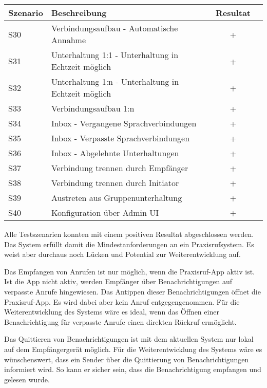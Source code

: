 \begin{table}[h]
    \centering
    \begin{tabular}{|l|p{11cm}|c|c|}
        \hline
        \textbf{Szenario} & \textbf{Beschreibung} & \textbf{Resultat} \\
        \hline
        S30         & Verbindungsaufbau - Automatische Annahme & +\\
        \hline
        S31         & Unterhaltung 1:1 - Unterhaltung in Echtzeit möglich & +\\
        \hline
        S32         & Unterhaltung 1:n - Unterhaltung in Echtzeit möglich & +\\
        \hline
        S33         & Verbindungsaufbau 1:n & +\\
        \hline
        S34         & Inbox - Vergangene Sprachverbindungen & +\\
        \hline
        S35         & Inbox - Verpasste Sprachverbindungen & +\\
        \hline
        S36         & Inbox - Abgelehnte Unterhaltungen & +\\
        \hline
        S37         & Verbindung trennen durch Empfänger & +\\
        \hline
        S38         & Verbindung trennen durch Initiator & +\\
        \hline
        S39         & Austreten aus Gruppenunterhaltung & +\\
        \hline
        S40         & Konfiguration über Admin UI & +\\
        \hline
    \end{tabular}\label{tab:funktion_testplan_2}
\end{table}

Alle Testszenarien konnten mit einem positiven Resultat abgeschlossen werden.
Das System erfüllt damit die Mindestanforderungen an ein Praxisrufsystem.
Es weist aber durchaus noch Lücken und Potential zur Weiterentwicklung auf.

Das Empfangen von Anrufen ist nur möglich, wenn die Praxisruf-App aktiv ist.
Ist die App nicht aktiv, werden Empfänger über Benachrichtigungen auf verpasste Anrufe hingewiesen.
Das Antippen dieser Benachrichtigungen öffnet die Praxisruf-App.
Es wird dabei aber kein Anruf entgegengenommen.
Für die Weiterentwicklung des Systems wäre es ideal, wenn das Öffnen einer Benachrichtigung für verpasste Anrufe einen direkten Rückruf ermöglicht.

Das Quittieren von Benachrichtigungen ist mit dem aktuellen System nur lokal auf dem Empfängergerät möglich.
Für die Weiterentwicklung des Systems wäre es wünschenswert, dass ein Sender über die Quittierung von Benachrichtigungen informiert wird.
So kann er sicher sein, dass die Benachrichtigung empfangen und gelesen wurde.

